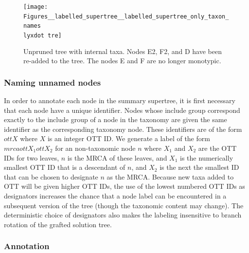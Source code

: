 \documentclass[fleqn,12pt,lineno,english]{wlpeerj}
\newcommand{\lyxdot}{.}
\begin{document}
\begin{figure}
\begin{centering}
\texttt{[image: Figures\_\_labelled\_supertree\_\_labelled\_supertree\_only\_taxon\_names\\lyxdot tre]}
\par\end{centering}
\caption{Unpruned tree with internal taxa. Nodes E2, F2, and D have been re-added
to the tree. The nodes E and F are no longer monotypic.}
\end{figure}


\subsubsection{Naming unnamed nodes}

In order to annotate each node in the summary supertree, it is first
necessary that each node have a unique identifier. Nodes whose include
group correspond exactly to the include group of a node in the taxonomy
are given the same identifier as the corresponding taxonomy node.
These identifiers are of the form $ottX$ where $X$ is an integer
OTT ID. We generate a label of the form $mrcaottX_{1}ottX_{2}$ for
an non-taxonomic node $n$ where $X_{1}$ and $X_{2}$ are the OTT
IDs for two leaves, $n$ is the MRCA of these leaves, and $X_{1}$
is the numerically smallest OTT ID that is a descendant of $n$, and
$X_{2}$ is the next the smallest ID that can be chosen to designate
$n$ as the MRCA. Because new taxa added to OTT will be given higher
OTT IDs, the use of the lowest numbered OTT IDs as designators increases
the chance that a node label can be encountered in a subsequent version
of the tree (though the taxonomic content may change). The deterministic
choice of designators also makes the labeling insensitive to branch
rotation of the grafted solution tree.

\subsubsection{Annotation}\label{sec:Annotation}
\end{document}
